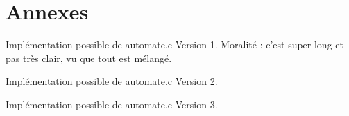 \documentclass[10pt]{article}
\begin{document}
\newpage
\section*{Annexes}
  Implémentation possible de automate.c Version 1. Moralité : c'est
  super long et pas très clair, vu que tout est mélangé.

  

  \vspace{1cm}
  Implémentation possible de automate.c Version 2.

  

  \vspace{1cm}
  Implémentation possible de automate.c Version 3.

  
\end{document}
